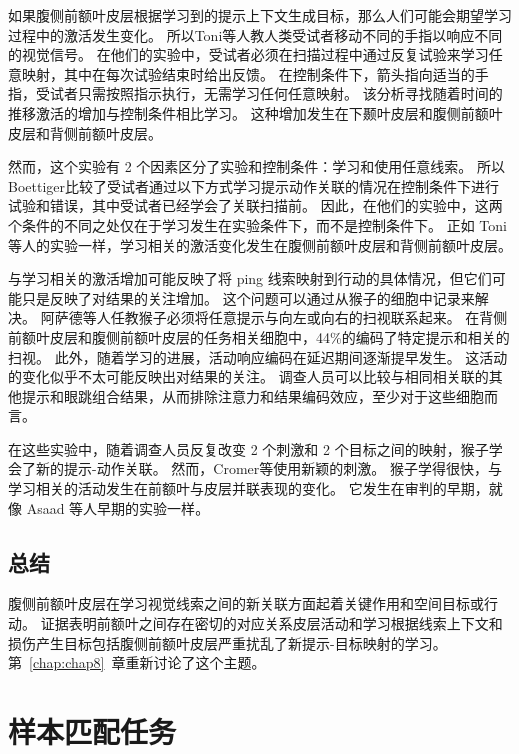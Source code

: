 如果腹侧前额叶皮层根据学习到的提示上下文生成目标，那么人们可能会期望学习过程中的激活发生变化。 
所以Toni等人\cite{toni2001learning}教人类受试者移动不同的手指以响应不同的视觉信号。 
在他们的实验中，受试者必须在扫描过程中通过反复试验来学习任意映射，其中在每次试验结束时给出反馈。
在控制条件下，箭头指向适当的手指，受试者只需按照指示执行，无需学习任何任意映射。
该分析寻找随着时间的推移激活的增加与控制条件相比学习。
这种增加发生在下颞叶皮层和腹侧前额叶皮层和背侧前额叶皮层。
\par


然而，这个实验有 2 个因素区分了实验和控制条件：学习和使用任意线索。 
所以 Boettiger\cite{boettiger2005frontal}比较了受试者通过以下方式学习提示动作关联的情况在控制条件下进行试验和错误，其中受试者已经学会了关联扫描前。 
因此，在他们的实验中，这两个条件的不同之处仅在于学习发生在实验条件下，而不是控制条件下。 
正如 Toni 等人的实验一样\cite{toni2001learning}，学习相关的激活变化发生在腹侧前额叶皮层和背侧前额叶皮层。
\par


与学习相关的激活增加可能反映了将 ping 线索映射到行动的具体情况，但它们可能只是反映了对结果的关注增加。
这个问题可以通过从猴子的细胞中记录来解决。
阿萨德等人\cite{asaad1998neural}任教猴子必须将任意提示与向左或向右的扫视联系起来。 
在背侧前额叶皮层和腹侧前额叶皮层的任务相关细胞中，44\%的编码了特定提示和相关的扫视。
此外，随着学习的进展，活动响应编码在延迟期间逐渐提早发生。
这活动的变化似乎不太可能反映出对结果的关注。
调查人员可以比较与相同相关联的其他提示和眼跳组合结果，从而排除注意力和结果编码效应，至少对于这些细胞而言。
\par


在这些实验中，随着调查人员反复改变 2 个刺激和 2 个目标之间的映射，猴子学会了新的提示-动作关联。 
然而，Cromer等\cite{cromer2011rapid}使用新颖的刺激。
猴子学得很快，与学习相关的活动发生在前额叶与皮层并联表现的变化。 
它发生在审判的早期，就像 Asaad 等人早期的实验一样\cite{asaad1998neural}。



\subsection{总结}

腹侧前额叶皮层在学习视觉线索之间的新关联方面起着关键作用和空间目标或行动。
证据表明前额叶之间存在密切的对应关系皮层活动和学习根据线索上下文和损伤产生目标包括腹侧前额叶皮层严重扰乱了新提示-目标映射的学习。
第~\ref{chap:chap8}~章重新讨论了这个主题。



\section{样本匹配任务}
\par

